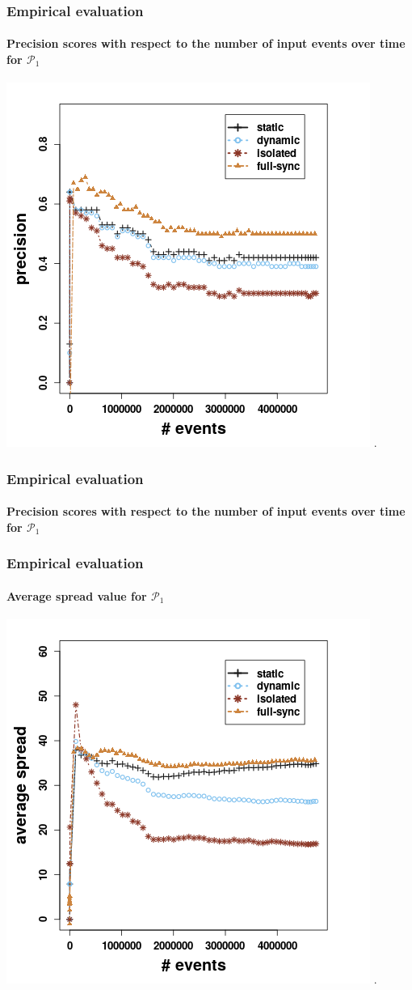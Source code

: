 \begin{frame}
	
	\frametitle{Empirical evaluation }
	\framesubtitle{Precision scores with respect to the number of input events over time for $\mathcal{P}_1$}
	
	\begin{center}
		\includegraphics[width=.8\textwidth,height=.7\linewidth]{figures/precision_p1.png}
		.
	\end{center}
	
\end{frame}

\begin{frame}
	
	\frametitle{Empirical evaluation }
	\framesubtitle{Precision scores with respect to the number of input events over time for $\mathcal{P}_1$}
	
	
\end{frame}




\begin{frame}
	
	\frametitle{Empirical evaluation }
	\framesubtitle{Average spread value for $\mathcal{P}_1$}
	
	\begin{center}
		\includegraphics[width=.8\textwidth,height=.7\linewidth]{figures/spread_p1.png}
		.
	\end{center}
	
\end{frame}

